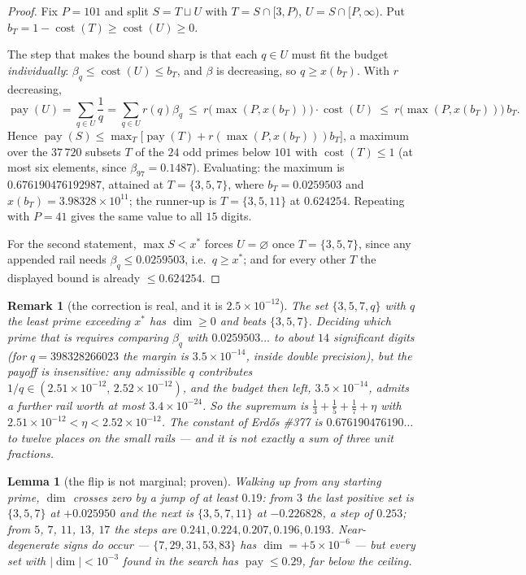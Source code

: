 \documentclass[11pt]{article}
\newtheorem{lemma}[theorem]{Lemma}
\newtheorem{remark}[theorem]{Remark}
\begin{document}
\begin{proof}
Fix $P=101$ and split $S=T\sqcup U$ with $T=S\cap[3,P)$, $U=S\cap[P,\infty)$.
Put $b_T=1-\operatorname{cost}(T)\ge\operatorname{cost}(U)\ge0$.

The step that makes the bound sharp is that each $q\in U$ must fit the budget
\emph{individually}: $\beta_q\le\operatorname{cost}(U)\le b_T$, and $\beta$ is
decreasing, so $q\ge x(b_T)$.  With $r$ decreasing,
\[
  \operatorname{pay}(U)=\sum_{q\in U}\frac1q=\sum_{q\in U}r(q)\beta_q
  \ \le\ r\bigl(\max(P,x(b_T))\bigr)\cdot\operatorname{cost}(U)
  \ \le\ r\bigl(\max(P,x(b_T))\bigr)\,b_T .
\]
Hence $\operatorname{pay}(S)\le\max_T\bigl[\operatorname{pay}(T)+r(\max(P,x(b_T)))b_T\bigr]$,
a maximum over the $37\,720$ subsets $T$ of the $24$ odd primes below $101$
with $\operatorname{cost}(T)\le1$ (at most six elements, since
$\beta_{97}=0.1487$).  Evaluating: the maximum is $0.676190476192987$, attained
at $T=\{3,5,7\}$, where $b_T=0.0259503$ and $x(b_T)=3.98328\times10^{11}$; the
runner-up is $T=\{3,5,11\}$ at $0.624254$.  Repeating with $P=41$ gives the
same value to all $15$ digits.

For the second statement, $\max S<x^\ast$ forces $U=\varnothing$ once
$T=\{3,5,7\}$, since any appended rail needs $\beta_q\le0.0259503$, i.e.\
$q\ge x^\ast$; and for every other $T$ the displayed bound is already
$\le0.624254$.
\end{proof}

\begin{remark}[the correction is real, and it is $2.5\times10^{-12}$]
The set $\{3,5,7,q\}$ with $q$ the least prime exceeding $x^\ast$ has
$\dim\ge0$ and beats $\{3,5,7\}$.  Deciding \emph{which} prime that is requires
comparing $\beta_q$ with $0.0259503\ldots$ to about $14$ significant digits
(for $q=398328266023$ the margin is $3.5\times10^{-14}$, inside double
precision), but the payoff is insensitive: any admissible $q$ contributes
$1/q\in(2.51\times10^{-12},\,2.52\times10^{-12})$, and the budget then left,
$3.5\times10^{-14}$, admits a further rail worth at most $3.4\times10^{-24}$.
So the supremum is $\frac13+\frac15+\frac17+\eta$ with
$2.51\times10^{-12}<\eta<2.52\times10^{-12}$.  The constant of Erd\H{o}s \#377
is $0.676190476190\ldots$ to twelve places on the small rails --- and it is not
exactly a sum of three unit fractions.
\end{remark}

\begin{lemma}[the flip is not marginal; proven]\label{lem:flip}
Walking up from any starting prime, $\dim$ crosses zero by a jump of at least
$0.19$: from $3$ the last positive set is $\{3,5,7\}$ at $+0.025950$ and the
next is $\{3,5,7,11\}$ at $-0.226828$, a step of $0.253$; from $5$, $7$, $11$,
$13$, $17$ the steps are $0.241,0.224,0.207,0.196,0.193$.  Near-degenerate
signs do occur --- $\{7,29,31,53,83\}$ has $\dim=+5\times10^{-6}$ --- but every
set with $|\dim|<10^{-3}$ found in the search has
$\operatorname{pay}\le0.29$, far below the ceiling.
\end{lemma}
\end{document}
